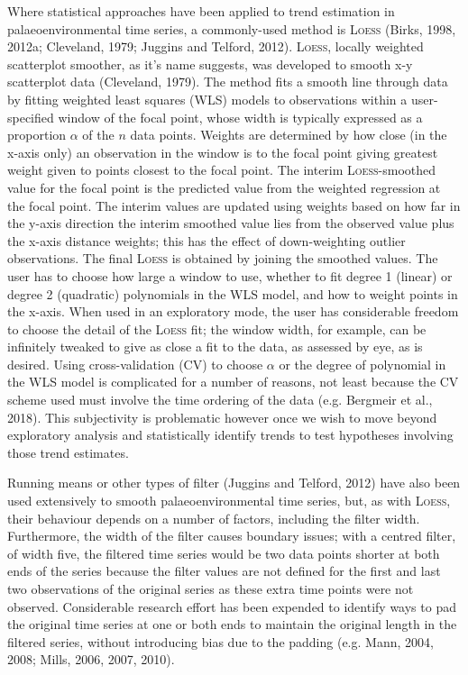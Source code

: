 \documentclass[12pt,]{article}
\newcommand{\loess}{\textsc{Loess}}
\begin{document}
Where statistical approaches have been applied to trend estimation in
palaeoenvironmental time series, a commonly-used method is \loess{}
(Birks, 1998, 2012a; Cleveland, 1979; Juggins and Telford, 2012).
\loess{}, locally weighted scatterplot smoother, as it's name suggests,
was developed to smooth x-y scatterplot data (Cleveland, 1979). The
method fits a smooth line through data by fitting weighted least squares
(WLS) models to observations within a user-specified window of the focal
point, whose width is typically expressed as a proportion \(\alpha\) of
the \(n\) data points. Weights are determined by how close (in the
x-axis only) an observation in the window is to the focal point giving
greatest weight given to points closest to the focal point. The interim
\loess{}-smoothed value for the focal point is the predicted value from
the weighted regression at the focal point. The interim values are
updated using weights based on how far in the y-axis direction the
interim smoothed value lies from the observed value plus the x-axis
distance weights; this has the effect of down-weighting outlier
observations. The final \loess{} is obtained by joining the smoothed
values. The user has to choose how large a window to use, whether to fit
degree 1 (linear) or degree 2 (quadratic) polynomials in the WLS model,
and how to weight points in the x-axis. When used in an exploratory
mode, the user has considerable freedom to choose the detail of the
\loess{} fit; the window width, for example, can be infinitely tweaked
to give as close a fit to the data, as assessed by eye, as is desired.
Using cross-validation (CV) to choose \(\alpha\) or the degree of
polynomial in the WLS model is complicated for a number of reasons, not
least because the CV scheme used must involve the time ordering of the
data (e.g. Bergmeir et al., 2018). This subjectivity is problematic
however once we wish to move beyond exploratory analysis and
statistically identify trends to test hypotheses involving those trend
estimates.

Running means or other types of filter (Juggins and Telford, 2012) have
also been used extensively to smooth palaeoenvironmental time series,
but, as with \loess{}, their behaviour depends on a number of factors,
including the filter width. Furthermore, the width of the filter causes
boundary issues; with a centred filter, of width five, the filtered time
series would be two data points shorter at both ends of the series
because the filter values are not defined for the first and last two
observations of the original series as these extra time points were not
observed. Considerable research effort has been expended to identify
ways to pad the original time series at one or both ends to maintain the
original length in the filtered series, without introducing bias due to
the padding (e.g. Mann, 2004, 2008; Mills, 2006, 2007, 2010).
\end{document}

